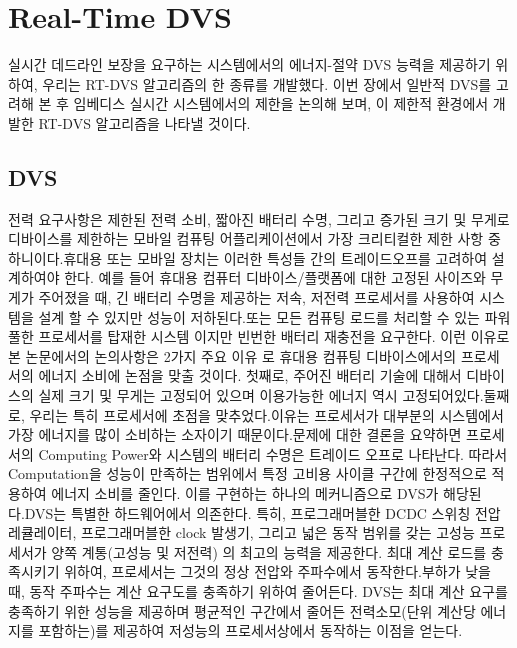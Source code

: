 \documentclass[11pt
  , a4paper
  , article
  , oneside
]{memoir}
\begin{document}
\chapter{Real-Time DVS}
실시간 데드라인 보장을 요구하는 시스템에서의 에너지-절약 DVS 능력을 제공하기 위하여, 우리는 RT-DVS 알고리즘의 한 종류를 개발했다. 이번 장에서 일반적 DVS를 고려해 본 후 임베디스 실시간 시스템에서의 제한을 논의해 보며, 이 제한적 환경에서 개발한 RT-DVS 알고리즘을 나타낼 것이다.

\section{DVS}
전력 요구사항은 제한된 전력 소비, 짧아진 배터리 수명, 그리고 증가된 크기 및 무게로 디바이스를 제한하는 모바일 컴퓨팅 어플리케이션에서 가장 크리티컬한 제한 사항 중 하니이다.휴대용 또는 모바일 장치는 이러한 특성들 간의 트레이드오프를 고려하여 설계하여야 한다. 예를 들어 휴대용 컴퓨터 디바이스/플랫폼에 대한 고정된 사이즈와 무게가 주어졌을 때, 긴 배터리 수명을 제공하는 저속, 저전력 프로세서를 사용하여 시스템을 설계 할 수 있지만 성능이 저하된다.또는 모든 컴퓨팅 로드를 처리할 수 있는 파워풀한 프로세서를 탑재한 시스템 이지만 빈번한 배터리 재충전을 요구한다. 이런 이유로 본 논문에서의 논의사항은 2가지 주요 이유 로 휴대용 컴퓨팅 디바이스에서의 프로세서의 에너지 소비에 논점을 맞출 것이다.   
첫째로, 주어진 배터리 기술에 대해서 디바이스의 실제 크기 및 무게는 고정되어 있으며 이용가능한 에너지 역시 고정되어있다.둘째로, 우리는 특히 프로세서에 초점을 맞추었다.이유는 프로세서가 대부분의 시스템에서 가장 에너지를 많이 소비하는 소자이기 때문이다.문제에 대한 결론을 요약하면 프로세서의 Computing Power와 시스템의 배터리 수명은 트레이드 오프로 나타난다. 따라서 Computation을 성능이 만족하는 범위에서 특정 고비용 사이클 구간에 한정적으로 적용하여 에너지 소비를 줄인다. 이를 구현하는 하나의 메커니즘으로 DVS가 해당된다.DVS는 특별한 하드웨어에서 의존한다. 특히, 프로그래머블한 DCDC 스위칭 전압 레큘레이터, 프로그래머블한 clock 발생기, 그리고 넓은 동작 범위를 갖는 고성능 프로세서가 양쪽 계통(고성능 및 저전력) 의 최고의 능력을 제공한다. 최대 계산 로드를 충족시키기 위하여, 프로세서는 그것의 정상 전압와 주파수에서 동작한다.부하가 낮을 때, 동작 주파수는 계산 요구도를 충족하기 위하여 줄어든다.
DVS는 최대 계산 요구를 충족하기 위한 성능을 제공하며 평균적인 구간에서 
줄어든 전력소모(단위 계산당 에너지를 포함하는)를 제공하여 저성능의 프로세서상에서 동작하는 이점을 얻는다.      
\end{document}
